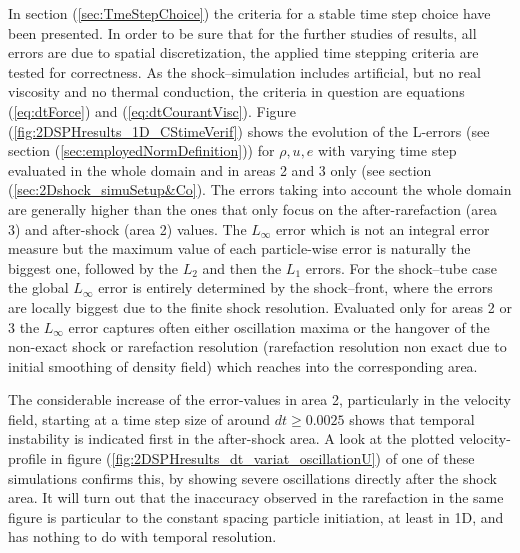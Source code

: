 \documentclass{report}
\begin{document}
In section (\ref{sec:TmeStepChoice}) the criteria for a stable time step choice have been presented. In order to be sure that for the further studies of results, all errors are due to spatial discretization, the applied time stepping criteria are tested for correctness. As the shock--simulation includes artificial, but no real viscosity and no thermal conduction, the criteria in question are equations (\ref{eq:dtForce}) and (\ref{eq:dtCourantVisc}). Figure (\ref{fig:2DSPHresults_1D_CStimeVerif}) shows the evolution of the L-errors (see section (\ref{sec:employedNormDefinition})) for $\rho, u, e$ with varying time step evaluated in the whole domain and in areas 2 and 3 only (see section (\ref{sec:2Dshock_simuSetup&Co}). 
The errors taking into account the whole domain are generally higher than the ones that only focus on the after-rarefaction (area 3) and after-shock (area 2) values. The $L_{\infty}$ error which is not an integral error measure but the maximum value of each particle-wise error is naturally the biggest one, followed by the $L_2$ and then the $L_1$ errors. For the shock--tube case the global $L_{\infty}$ error is entirely determined by the shock--front, where the errors are locally biggest due to the finite shock resolution. Evaluated only for areas 2 or 3 the $L_{\infty}$ error captures often either oscillation maxima or the hangover of the non-exact shock or rarefaction resolution (rarefaction resolution non exact due to initial smoothing of density field) which reaches into the corresponding area.

The considerable increase of the error-values in area 2, particularly in the velocity field, starting at a time step size of around $dt\geq0.0025$ shows that temporal instability is indicated first in the after-shock area. A look at the plotted velocity-profile in figure (\ref{fig:2DSPHresults_dt_variat_oscillationU}) of one of these simulations confirms this, by showing severe oscillations directly after the shock area. It will turn out that the inaccuracy observed in the rarefaction in the same figure is particular to the constant spacing particle initiation, at least in 1D, and has nothing to do with temporal resolution.
\end{document}
